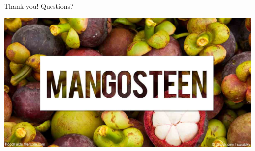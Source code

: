 \documentclass[usenames,dvipsnames,notes]{beamer}
\begin{document}
\begin{frame}{ $  $ }

{\Huge Thank you! Questions?}
\begin{center}
	\includegraphics[width=.7\textwidth]{figures/mangosteen}
\end{center}
\end{frame}



\end{document}

